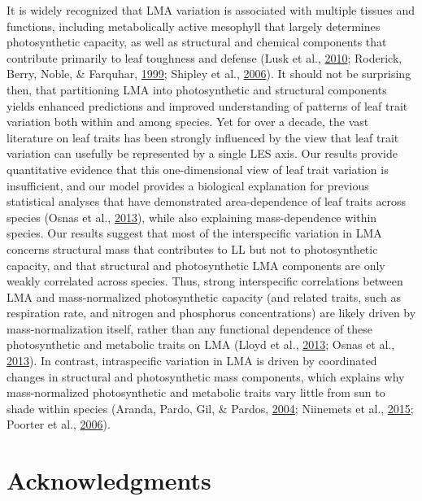 \documentclass[12pt,]{article}
\theoremstyle{definition}
\theoremstyle{definition}
\theoremstyle{definition}
\theoremstyle{remark}
\begin{document}
It is widely recognized that LMA variation is associated with multiple
tissues and functions, including metabolically active mesophyll that
largely determines photosynthetic capacity, as well as structural and
chemical components that contribute primarily to leaf toughness and
defense (Lusk et al., \protect\hyperlink{ref-Lusk2010}{2010}; Roderick,
Berry, Noble, \& Farquhar, \protect\hyperlink{ref-Roderick1999}{1999};
Shipley et al., \protect\hyperlink{ref-Shipley2006}{2006}). It should
not be surprising then, that partitioning LMA into photosynthetic and
structural components yields enhanced predictions and improved
understanding of patterns of leaf trait variation both within and among
species. Yet for over a decade, the vast literature on leaf traits has
been strongly influenced by the view that leaf trait variation can
usefully be represented by a single LES axis. Our results provide
quantitative evidence that this one-dimensional view of leaf trait
variation is insufficient, and our model provides a biological
explanation for previous statistical analyses that have demonstrated
area-dependence of leaf traits across species (Osnas et al.,
\protect\hyperlink{ref-Osnas2013}{2013}), while also explaining
mass-dependence within species. Our results suggest that most of the
interspecific variation in LMA concerns structural mass that contributes
to LL but not to photosynthetic capacity, and that structural and
photosynthetic LMA components are only weakly correlated across species.
Thus, strong interspecific correlations between LMA and mass-normalized
photosynthetic capacity (and related traits, such as respiration rate,
and nitrogen and phosphorus concentrations) are likely driven by
mass-normalization itself, rather than any functional dependence of
these photosynthetic and metabolic traits on LMA (Lloyd et al.,
\protect\hyperlink{ref-Lloyd2013}{2013}; Osnas et al.,
\protect\hyperlink{ref-Osnas2013}{2013}). In contrast, intraspecific
variation in LMA is driven by coordinated changes in structural and
photosynthetic mass components, which explains why mass-normalized
photosynthetic and metabolic traits vary little from sun to shade within
species (Aranda, Pardo, Gil, \& Pardos,
\protect\hyperlink{ref-Aranda2004}{2004}; Niinemets et al.,
\protect\hyperlink{ref-Niinemets2015}{2015}; Poorter et al.,
\protect\hyperlink{ref-Poorter2006b}{2006}).

\hypertarget{acknowledgments}{%
\section{Acknowledgments}\label{acknowledgments}}
\end{document}

